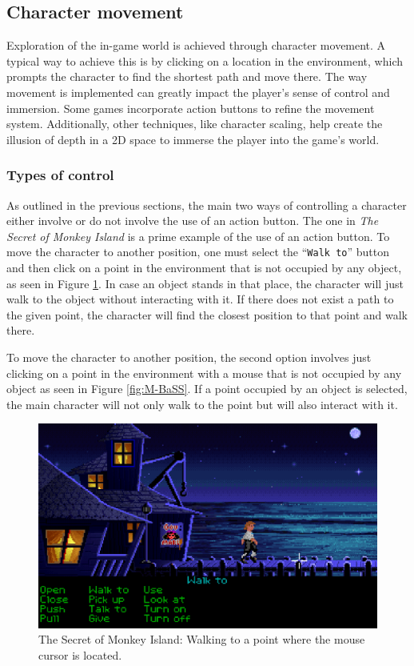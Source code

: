 \subsection{Character movement}
\label{sec:Character movement}
Exploration of the in-game world is achieved through character movement. A typical way to achieve this is by clicking on a location in the environment, which prompts the character to find the shortest path and move there. The way movement is implemented can greatly impact the player's sense of control and immersion. Some games incorporate action buttons to refine the movement system. Additionally, other techniques, like character scaling, help create the illusion of depth in a 2D space to immerse the player into the game's world.

\subsubsection{Types of control}
As outlined in the previous sections, the main two ways of controlling a character either involve or do not involve the use of an action button. The one in \textit{The Secret of Monkey Island} is a prime example of the use of an action button. To move the character to another position, one must select the “\texttt{Walk to}” button and then click on a point in the environment that is not occupied by any object, as seen in Figure \ref{fig:M-TSoMI-W}. In case an object stands in that place, the character will just walk to the object without interacting with it. If there does not exist a path to the given point, the character will find the closest position to that point and walk there.

To move the character to another position, the second option involves just clicking on a point in the environment with a mouse that is not occupied by any object as seen in Figure \ref{fig:M-BaSS}. If a point occupied by an object is selected, the main character will not only walk to the point but will also interact with it.

\begin{figure}[H]
\centering
\includegraphics[width=.8\linewidth]{img/W-TSoMI.png}
\caption{The Secret of Monkey Island: Walking to a point where the mouse cursor is located.}
\label{fig:M-TSoMI-W}
\end{figure}

